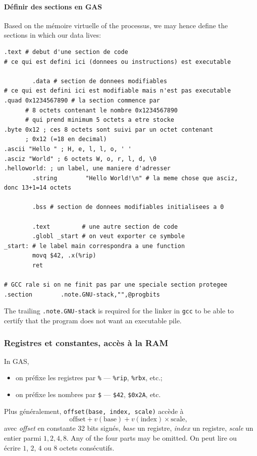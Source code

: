 \paragraph{Définir des sections en GAS} Based on the mémoire virtuelle of the
processus, we may hence define the sections in which our data lives:
\begin{lstlisting}[language=gas]
        .text # debut d'une section de code
# ce qui est defini ici (donnees ou instructions) est executable

        .data # section de donnees modifiables
# ce qui est defini ici est modifiable mais n'est pas executable
.quad 0x1234567890 # la section commence par
      # 8 octets contenant le nombre 0x1234567890
      # qui prend minimum 5 octets a etre stocke
.byte 0x12 ; ces 8 octets sont suivi par un octet contenant
      ; 0x12 (=18 en decimal)
.ascii "Hello " ; H, e, l, l, o, ' '
.asciz "World" ; 6 octets W, o, r, l, d, \0
.helloworld: ; un label, une maniere d'adresser
        .string        "Hello World!\n" # la meme chose que asciz, donc 13+1=14 octets

        .bss # section de donnees modifiables initialisees a 0

        .text         # une autre section de code
        .globl _start # on veut exporter ce symbole
_start: # le label main correspondra a une function
        movq $42, .x(%rip)
        ret

# GCC rale si on ne finit pas par une speciale section protegee
.section        .note.GNU-stack,"",@progbits
\end{lstlisting}

\begin{remark}
  The trailing \verb|.note.GNU-stack| is required for the linker in \verb|gcc|
  to be able to certify that the program does not want an executable pile.
\end{remark}

\subsubsection{Registres et constantes, accès à la RAM}
In GAS,
\begin{itemize}
  \item on préfixe les registres par \verb|%| --- \verb|%rip|, \verb|%rbx|, etc.;
  \item on préfixe les nombres par \verb|$| --- \verb|$42|, \verb|$0x2A|, etc.
\end{itemize}
Plus généralement, \verb|offset(base, index, scale)| accède à
\[
  \text{offset} + v(\text{base}) + v(\text{index}) \times \text{scale},
\]
avec \textit{offset} en constante 32 bits signés, \textit{base} un registre,
\textit{index} un registre, \textit{scale} un entier parmi
$1, 2, 4, 8$. Any of the four parts may be omitted. On peut lire ou écrire
$1$, $2$, $4$ ou $8$ octets consécutifs.


